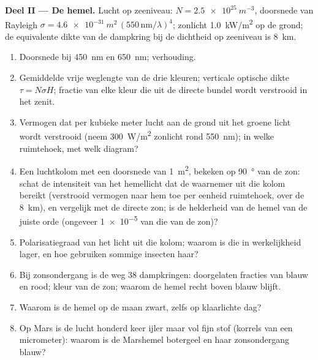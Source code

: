 \begin{problem}
\medskip
\noindent\textbf{Deel II --- De hemel.}
Lucht op zeeniveau: $N = \qty{2.5e25}{m^{-3}}$, doorsnede van Rayleigh
$\sigma =
\qty{4.6e-31}{m^2}\,(550\,\text{nm}/\lambda)^4$; zonlicht
\qty{1.0}{kW/m^2} op de grond; de equivalente dikte van de dampkring bij de
dichtheid op zeeniveau is \qty{8}{km}.
\begin{enumerate}[resume]
  \item Doorsnede bij \qty{450}{nm} en \qty{650}{nm}; verhouding.
  \item Gemiddelde vrije weglengte van de drie kleuren; verticale optische
        dikte $\tau = N\sigma H$; fractie van elke kleur die uit de directe
        bundel wordt verstrooid in het zenit.
  \item Vermogen dat per kubieke meter lucht aan de grond uit het groene
        licht wordt verstrooid (neem \qty{300}{W/m^2} zonlicht rond
        \qty{550}{nm}); in welke ruimtehoek, met welk diagram?
  \item Een luchtkolom met een doorsnede van \qty{1}{m^2}, bekeken op
        \qty{90}{\degree} van de zon: schat de intensiteit van het
        hemellicht dat de waarnemer uit die kolom bereikt (verstrooid
        vermogen naar hem toe per eenheid ruimtehoek, over de \qty{8}{km}),
        en vergelijk met de directe zon; is de helderheid van de hemel van
        de juiste orde (ongeveer \qty{1e-5}{} van die van de zon)?
  \item Polarisatiegraad van het licht uit die kolom; waarom is die in
        werkelijkheid lager, en hoe gebruiken sommige insecten haar?
  \item Bij zonsondergang is de weg $38$ dampkringen: doorgelaten fracties
        van blauw en rood; kleur van de zon; waarom de hemel recht boven
        blauw blijft.
  \item Waarom is de hemel op de maan zwart, zelfs op klaarlichte dag?
  \item Op Mars is de lucht honderd keer ijler maar vol fijn stof (korrels
        van een micrometer): waarom is de Marshemel botergeel en haar
        zonsondergang blauw?
\end{enumerate}


\end{problem}
